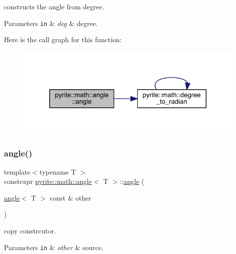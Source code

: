constructs the angle from degree.


\begin{DoxyParams}[1]{Parameters}
\mbox{\tt in}  & {\em deg} & degree. \\
\hline
\end{DoxyParams}
Here is the call graph for this function\+:
\nopagebreak
\begin{figure}[H]
\begin{center}
\leavevmode
\includegraphics[width=319pt]{d0/df1/classpyrite_1_1math_1_1angle_ab983c2beb0c1c127844dd437ffb5a6d6_cgraph}
\end{center}
\end{figure}
\mbox{\label{classpyrite_1_1math_1_1angle_a82354ef1bc05d04bc73c3959f30147c6}} 
\subsubsection{\texorpdfstring{angle()}{angle()}\hspace{0.1cm}{\footnotesize\ttfamily [4/5]}}
{\footnotesize\ttfamily template$<$typename T $>$ \\
constexpr \mbox{\hyperlink{classpyrite_1_1math_1_1angle}{pyrite\+::math\+::angle}}$<$ T $>$\+::\mbox{\hyperlink{classpyrite_1_1math_1_1angle}{angle}} (\begin{DoxyParamCaption}\item[{\mbox{\hyperlink{classpyrite_1_1math_1_1angle}{angle}}$<$ T $>$ const \&}]{other }\end{DoxyParamCaption})\hspace{0.3cm}{\ttfamily [inline]}}

copy constrcutor.


\begin{DoxyParams}[1]{Parameters}
\mbox{\tt in}  & {\em other} & source. \\
\hline
\end{DoxyParams}
\mbox{\label{classpyrite_1_1math_1_1angle_a7aeda1e3d5aa652daf62bc0aeff89245}} 
